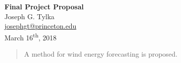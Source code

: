 \documentclass[11pt, oneside]{article}
\begin{document}
\begin{centering}
{\Large \textbf{Final Project Proposal}}\\
\vspace{\baselineskip}
Joseph G. Tylka\\
\href{mailto:josephgt@princeton.edu}{josephgt@princeton.edu}\\
\vspace{\baselineskip}
March 16\textsuperscript{th}, 2018\\
\end{centering}

\begin{abstract}
A method for wind energy forecasting is proposed.
\end{abstract}
\end{document}
